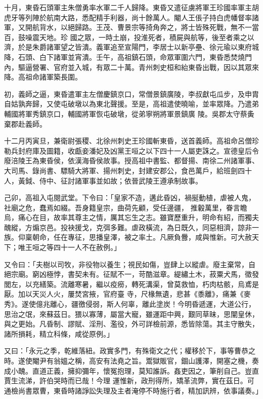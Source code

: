 \begin{pinyinscope}
 十月，東昏石頭軍主朱僧勇率水軍二千人歸降。東昏又遣征虜將軍王珍國率軍主胡虎牙等列陣於航南大路，悉配精手利器，尚十餘萬人。閹人王倀子持白虎幡督率諸軍，又開航背水，以絕歸路。王茂、曹景宗等掎角奔之，將士皆殊死戰，無不一當百，鼓噪震天地。珍
 國之眾，一時土崩，投淮死者，積屍與航等，後至者乘之以濟，於是朱爵諸軍望之皆潰。義軍追至宣陽門，李居士以新亭壘、徐元瑜以東府城降，石頭、白下諸軍並宵潰。壬午，高祖鎮石頭，命眾軍圍六門，東昏悉焚燒門內，驅逼營署、官府並入城，有眾二十萬。青州刺史桓和紿東昏出戰，因以其眾來降。高祖命諸軍築長圍。



 初，義師之逼，東昏遣軍主左僧慶鎮京口，常僧景鎮廣陵，李叔獻屯瓜步，及申胄自姑孰奔歸，又使屯破墩以為東北聲援。至是，高祖遣使曉喻，並率眾降。乃遣弟輔國將軍秀鎮京口，輔國將軍恢屯破墩，從弟寧朔將軍景鎮廣
 陵。吳郡太守蔡夤棄郡赴義師。



 十二月丙寅旦，兼衛尉張稷、北徐州刺史王珍國斬東昏，送首義師。高祖命呂僧珍勒兵封府庫及圖籍，收甗妾潘妃及凶黨王咺之以下四十一人屬吏誅之。宣德皇后令廢涪陵王為東昏侯，依漢海昏侯故事。授高祖中書監、都督揚、南徐二州諸軍事、大司馬、錄尚書、驃騎大將軍、揚州刺史，封建安郡公，食邑萬戶，給班劍四十人，黃鉞、侍中、征討諸軍事並如故；依晉武陵王遵承制故事。



 己卯，高祖入屯閱武堂。下令曰：「皇家不造，遘此昏凶，禍挻動植，虐被人鬼，社廟之危，蠢焉如綴。吾身籍皇宗，曲荷先顧，受任邊疆，
 推轂萬里，眷言瞻烏，痛心在目，故率其尊主之情，厲其忘生之志。雖寶歷重升，明命有紹，而獨夫醜縱，方煽京邑。投袂援戈，克弭多難。虐政橫流，為日既久，同惡相濟，諒非一族。仰稟朝命，任在專征，思播皇澤，被之率土。凡厥負釁，咸與惟新。可大赦天下；唯王咺之等四十一人不在赦例。」



 又令曰：「夫樹以司牧，非役物以養生；視民如傷，豈肆上以縱虐。廢主棄常，自絕宗廟。窮凶極悖，書契未有。征賦不一，苛酷滋章。緹繡土木，菽粟犬馬，徵發閭左，以充繕築。流離寒暑，繼以疫癆，轉死溝渠，曾莫救恤，朽肉枯骸，烏鳶是厭。加以天災人火，屢焚宮掖，官府臺
 寺，尺椽無遺，悲甚《黍離》，痛兼《麥秀》。遂使億兆離心，疆徼侵弱，斯人何辜，離此塗炭！今明昏遞運，大道公行，思治之氓，來蘇茲日。猥以寡薄，屬當大寵，雖運距中興，艱同草昧，思闡皇休，與之更始。凡昏制、謬賦、淫刑、濫役，外可詳檢前源，悉皆除蕩。其主守散失，諸所損耗，精立科條，咸從原例。」



 又曰：「永元之季，乾維落紐。政實多門，有殊衛文之代；權移於下，事等曹恭之時。遂使閹尹有翁媼之稱，高安有法堯之旨。鬻獄販官，錮山護澤，開塞之機，奏成小醜。直道正義，擁抑彌年，懷冤抱理，莫知誰訴。姦吏因之，筆削自己。豈直賈生流涕，許伯哭時而已哉！今理
 運惟新，政刑得所，矯革流弊，實在茲日。可通檢尚書眾曹，東昏時諸諍訟失理及主者淹停不時施行者，精加訊辨，依事議奏。」




\end{pinyinscope}
